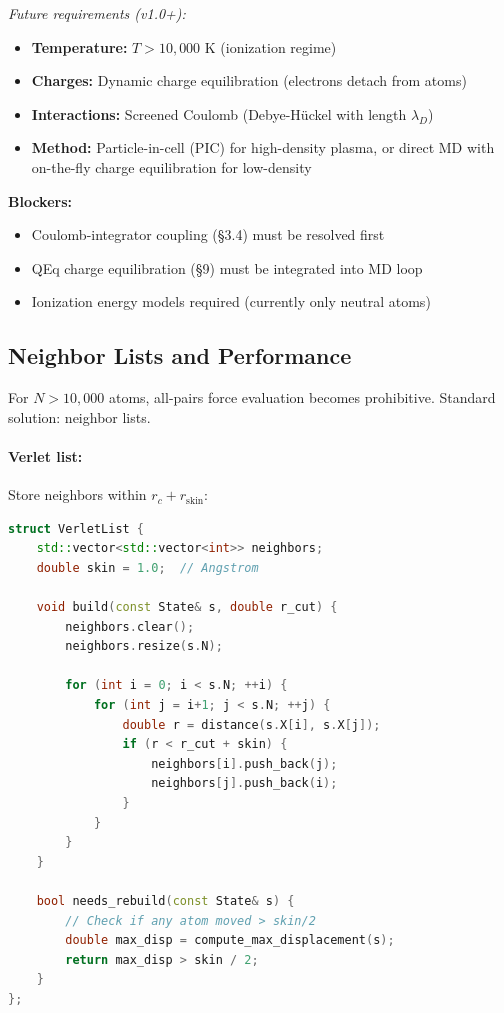 \documentclass[11pt]{article}
\begin{document}
\textit{Future requirements (v1.0+):}
\begin{itemize}
\item \textbf{Temperature:} $T > 10{,}000$ K (ionization regime)
\item \textbf{Charges:} Dynamic charge equilibration (electrons detach from atoms)
\item \textbf{Interactions:} Screened Coulomb (Debye-Hückel with length $\lambda_D$)
\item \textbf{Method:} Particle-in-cell (PIC) for high-density plasma, or direct MD with on-the-fly charge equilibration for low-density
\end{itemize}

\textbf{Blockers:}
\begin{itemize}
\item Coulomb-integrator coupling (§3.4) must be resolved first
\item QEq charge equilibration (§9) must be integrated into MD loop
\item Ionization energy models required (currently only neutral atoms)
\end{itemize}

\subsection{Neighbor Lists and Performance}

For $N > 10{,}000$ atoms, all-pairs force evaluation becomes prohibitive. Standard solution: neighbor lists.

\paragraph{Verlet list:}

Store neighbors within $r_c + r_{\text{skin}}$:

\begin{lstlisting}[language=C++]
struct VerletList {
    std::vector<std::vector<int>> neighbors;
    double skin = 1.0;  // Angstrom
    
    void build(const State& s, double r_cut) {
        neighbors.clear();
        neighbors.resize(s.N);
        
        for (int i = 0; i < s.N; ++i) {
            for (int j = i+1; j < s.N; ++j) {
                double r = distance(s.X[i], s.X[j]);
                if (r < r_cut + skin) {
                    neighbors[i].push_back(j);
                    neighbors[j].push_back(i);
                }
            }
        }
    }
    
    bool needs_rebuild(const State& s) {
        // Check if any atom moved > skin/2
        double max_disp = compute_max_displacement(s);
        return max_disp > skin / 2;
    }
};
\end{lstlisting}
\end{document}
